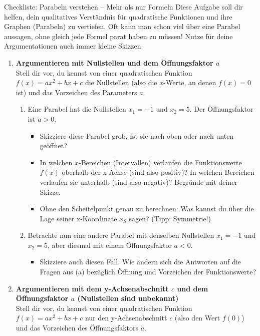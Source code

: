 \begin{aufgabenumgebung}{Checkliste: Parabeln verstehen – Mehr als nur Formeln}
Diese Aufgabe soll dir helfen, dein qualitatives Verständnis für quadratische Funktionen und ihre Graphen (Parabeln) zu vertiefen. Oft kann man schon viel über eine Parabel aussagen, ohne gleich jede Formel parat haben zu müssen! Nutze für deine Argumentationen auch immer kleine Skizzen.

\begin{enumerate}[label=\textbf{Teil \arabic*:}]
    \item \textbf{Argumentieren mit Nullstellen und dem Öffnungsfaktor $a$} \\
    Stell dir vor, du kennst von einer quadratischen Funktion $f(x)=ax^2+bx+c$ die Nullstellen (also die $x$-Werte, an denen $f(x)=0$ ist) und das Vorzeichen des Parameters $a$.

    \begin{enumerate}[label=(\alph*)]
        \item Eine Parabel hat die Nullstellen $x_1 = -1$ und $x_2 = 5$. Der Öffnungsfaktor ist $a > 0$.
        \begin{itemize}
            \item Skizziere diese Parabel grob. Ist sie nach oben oder nach unten geöffnet?
            \item In welchen $x$-Bereichen (Intervallen) verlaufen die Funktionswerte $f(x)$ oberhalb der x-Achse (sind also positiv)? In welchen Bereichen verlaufen sie unterhalb (sind also negativ)? Begründe mit deiner Skizze.
            \item Ohne den Scheitelpunkt genau zu berechnen: Was kannst du über die Lage seiner x-Koordinate $x_S$ sagen? (Tipp: Symmetrie!)
        \end{itemize}
        \item Betrachte nun eine andere Parabel mit denselben Nullstellen $x_1 = -1$ und $x_2 = 5$, aber diesmal mit einem Öffnungsfaktor $a < 0$.
        \begin{itemize}
            \item Skizziere auch diesen Fall. Wie ändern sich die Antworten auf die Fragen aus (a) bezüglich Öffnung und Vorzeichen der Funktionswerte?
        \end{itemize}
    \end{enumerate}

    \item \textbf{Argumentieren mit dem y-Achsenabschnitt $c$ und dem Öffnungsfaktor $a$ (Nullstellen sind unbekannt)} \\
    Stell dir vor, du kennst von einer quadratischen Funktion $f(x)=ax^2+bx+c$ nur den y-Achsenabschnitt $c$ (also den Wert $f(0)$) und das Vorzeichen des Öffnungsfaktors $a$.


\end{enumerate}
\end{aufgabenumgebung}
